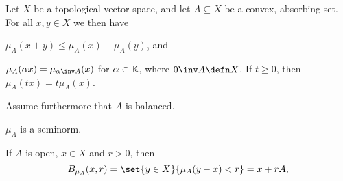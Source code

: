 \documentclass[article, a4paper, 11pt, oneside]{memoir}
\numberwithin{equation}{chapter}
\begin{document}
\begin{lemma}
    Let $X$ be a topological vector space, and let $A \subseteq X$ be a convex, absorbing set. For all $x, y \in X$ we then have
    \begin{enumlem}
        \item $\mu_A(x + y) \leq \mu_A(x) + \mu_A(y)$, and
        \item $\mu_A(\alpha x) = \mu_{\alpha\inv A}(x)$ for $\alpha \in \mathbb{K}$, where $0\inv A \defn X$. If $t \geq 0$, then $\mu_A(tx) = t\mu_A(x)$.
    \end{enumlem}
    Assume furthermore that $A$ is balanced.
    \begin{enumlem}[resume]
        \item \label{enum:Minkowski-functional-seminorm} $\mu_A$ is a seminorm.
        \item \label{enum:Minkowski-functional-balls} If $A$ is open, $x \in X$ and $r > 0$, then
        \begin{equation*}
            \ball[\mu_A]{x}{r}
                = \set{y \in X}{\mu_A(y-x) < r}
                = x + rA,
        \end{equation*}
    \end{enumlem}
\end{lemma}
\end{document}
